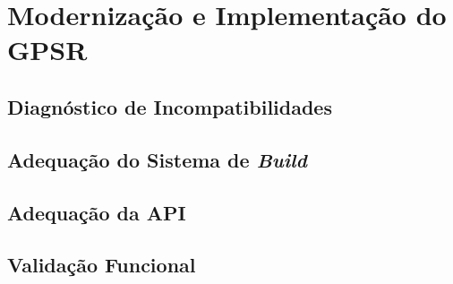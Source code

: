 \chapter{Modernização e Implementação do GPSR}\label{cap:implementacao}
\section{Diagnóstico de Incompatibilidades}
\section{Adequação do Sistema de \textit{Build}}
\section{Adequação da API}
\section{Validação Funcional}